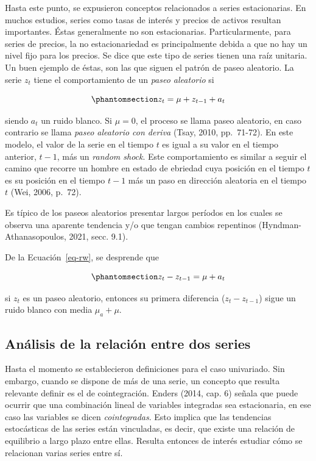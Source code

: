 \documentclass[12pt]{article}
\begin{document}
Hasta este punto, se expusieron conceptos relacionados a series
estacionarias. En muchos estudios, series como tasas de interés y
precios de activos resultan importantes. Éstas generalmente no son
estacionarias. Particularmente, para series de precios, la no
estacionariedad es principalmente debida a que no hay un nivel fijo para
los precios. Se dice que este tipo de series tienen una raíz unitaria.
Un buen ejemplo de éstas, son las que siguen el patrón de paseo
aleatorio. La serie \(z_t\) tiene el comportamiento de un \emph{paseo
aleatorio} si

\begin{equation}\phantomsection\label{eq-rw}{
z_t = \mu + z_{t-1} + a_t
}\end{equation}

siendo \(a_t\) un ruido blanco. Si \(\mu = 0\), el proceso se llama
paseo aleatorio, en caso contrario se llama \emph{paseo aleatorio con
deriva} (Tsay, 2010, pp.~71-72). En este modelo, el valor de la serie en
el tiempo \(t\) es igual a su valor en el tiempo anterior, \(t-1\), más
un \emph{random shock}. Este comportamiento es similar a seguir el
camino que recorre un hombre en estado de ebriedad cuya posición en el
tiempo \(t\) es su posición en el tiempo \(t-1\) más un paso en
dirección aleatoria en el tiempo \(t\) (Wei, 2006, p.~72).

Es típico de los paseos aleatorios presentar largos períodos en los
cuales se observa una aparente tendencia y/o que tengan cambios
repentinos (Hyndman-Athanasopoulos, 2021, secc. 9.1).

De la Ecuación~\ref{eq-rw}, se desprende que

\begin{equation}\phantomsection\label{eq-dif_rw}{
z_t - z_{t-1} = \mu + a_t
}\end{equation}

si \(z_t\) es un paseo aleatorio, entonces su primera diferencia
(\(z_t - z_{t-1}\)) sigue un ruido blanco con media \(\mu_a + \mu\).

\subsection{Análisis de la relación entre dos
series}\label{anuxe1lisis-de-la-relaciuxf3n-entre-dos-series}

Hasta el momento se establecieron definiciones para el caso univariado.
Sin embargo, cuando se dispone de más de una serie, un concepto que
resulta relevante definir es el de cointegración. Enders (2014, cap. 6)
señala que puede ocurrir que una combinación lineal de variables
integradas sea estacionaria, en ese caso las variables se dicen
\emph{cointegradas}. Esto implica que las tendencias estocásticas de las
series están vinculadas, es decir, que existe una relación de equilibrio
a largo plazo entre ellas. Resulta entonces de interés estudiar cómo se
relacionan varias series entre sí.
\end{document}
